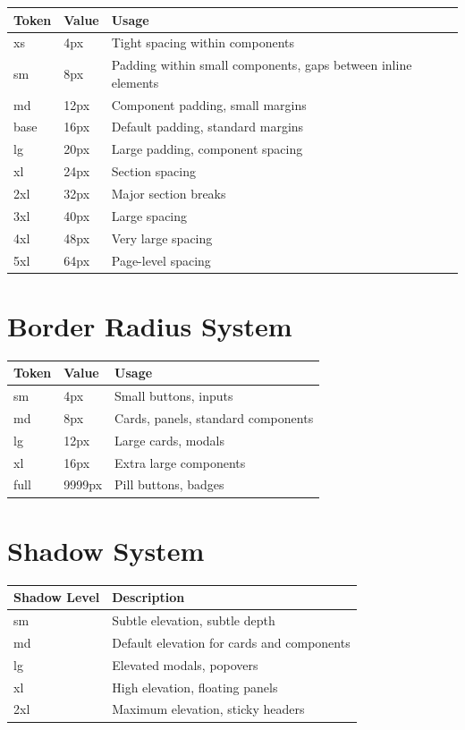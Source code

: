 \documentclass{report}
\begin{document}
\begin{table}[h]
\centering
\begin{tabular}{|l|l|l|}
\hline
\textbf{Token} & \textbf{Value} & \textbf{Usage} \\
\hline
xs & 4px & Tight spacing within components \\
\hline
sm & 8px & Padding within small components, gaps between inline elements \\
\hline
md & 12px & Component padding, small margins \\
\hline
base & 16px & Default padding, standard margins \\
\hline
lg & 20px & Large padding, component spacing \\
\hline
xl & 24px & Section spacing \\
\hline
2xl & 32px & Major section breaks \\
\hline
3xl & 40px & Large spacing \\
\hline
4xl & 48px & Very large spacing \\
\hline
5xl & 64px & Page-level spacing \\
\hline
\end{tabular}
\end{table}

\section{Border Radius System}

\begin{table}[h]
\centering
\begin{tabular}{|l|l|l|}
\hline
\textbf{Token} & \textbf{Value} & \textbf{Usage} \\
\hline
sm & 4px & Small buttons, inputs \\
\hline
md & 8px & Cards, panels, standard components \\
\hline
lg & 12px & Large cards, modals \\
\hline
xl & 16px & Extra large components \\
\hline
full & 9999px & Pill buttons, badges \\
\hline
\end{tabular}
\end{table}

\section{Shadow System}

\begin{table}[h]
\centering
\begin{tabular}{|l|l|}
\hline
\textbf{Shadow Level} & \textbf{Description} \\
\hline
sm & Subtle elevation, subtle depth \\
\hline
md & Default elevation for cards and components \\
\hline
lg & Elevated modals, popovers \\
\hline
xl & High elevation, floating panels \\
\hline
2xl & Maximum elevation, sticky headers \\
\hline
\end{tabular}
\end{table}
\end{document}
